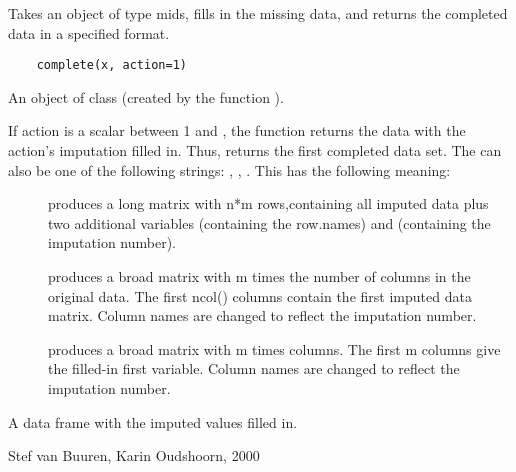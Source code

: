 \begin{Description}\relax
Takes an object of type mids, fills in the missing data, and
returns the completed data in a specified format.
\end{Description}
\begin{Usage}
\begin{verbatim}
    complete(x, action=1)
\end{verbatim}
\end{Usage}
\begin{Arguments}
\begin{ldescription}
\item[\code{x}] An object of class 
(created by the function ).
\item[\code{action}] If action is a scalar between 1 and ,
the function returns the data with the action's
imputation filled in. Thus,  returns
the first
completed data set. 
The can also be one of the following
strings: , , .
This has the following meaning:
\begin{description}
\item[] produces a long matrix with n*m
rows,containing all imputed data plus two additional
variables  (containing the row.names)
and  (containing the imputation number).
\item[] produces a broad matrix with m times
the number of columns in the original data.
The first ncol() columns contain the first
imputed data matrix. Column names are changed to
reflect the imputation number.
\item[] produces a broad matrix with m times
 columns. The first m columns
give the filled-in first variable. Column names are
changed to reflect the imputation number.
\end{description}

\end{ldescription}
\end{Arguments}
\begin{Value}
A data frame with the imputed values filled in.
\end{Value}
\begin{Author}\relax
Stef van Buuren, Karin Oudshoorn, 2000
\end{Author}
